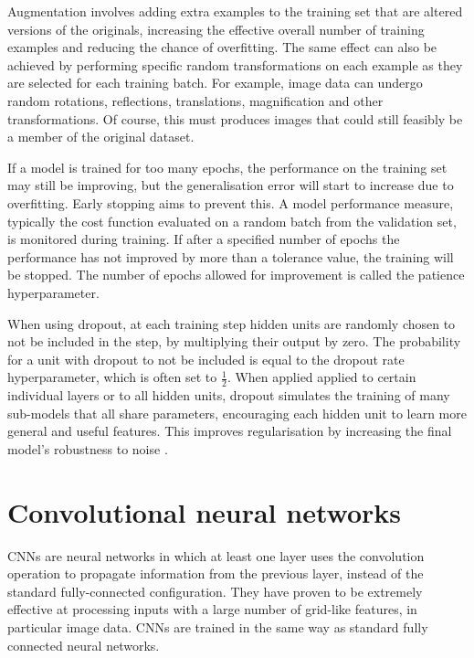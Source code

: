 \documentclass[12pt]{article}
\begin{document}
Augmentation involves adding extra examples to the training set that are altered versions of the originals, increasing the effective overall number of training examples and reducing the chance of overfitting. The same effect can also be achieved by performing specific random transformations on each example as they are selected for each training batch. For example, image data can undergo random rotations, reflections, translations, magnification and other transformations. Of course, this must produces images that could still feasibly be a member of the original dataset.

If a model is trained for too many epochs, the performance on the training set may still be improving, but the generalisation error will start to increase due to overfitting. Early stopping aims to prevent this. A model performance measure, typically the cost function evaluated on a random batch from the validation set, is monitored during training. If after a specified number of epochs the performance has not improved by more than a tolerance value, the training will be stopped. The number of epochs allowed for improvement is called the patience hyperparameter.

When using dropout, at each training step hidden units are randomly chosen to not be included in the step, by multiplying their output by zero. The probability for a unit with dropout to not be included is equal to the dropout rate hyperparameter, which is often set to $\frac{1}{2}$. When applied applied to certain individual layers or to all hidden units, dropout simulates the training of many sub-models that all share parameters, encouraging each hidden unit to learn more general and useful features. This improves regularisation by increasing the final model's robustness to noise \cite{Srivastava2014}.

\section{Convolutional neural networks}
CNNs are neural networks in which at least one layer uses the convolution operation to propagate information from the previous layer, instead of the standard fully-connected configuration. They have proven to be extremely effective at processing inputs with a large number of grid-like features, in particular image data. CNNs are trained in the same way as standard fully connected neural networks.
\end{document}

